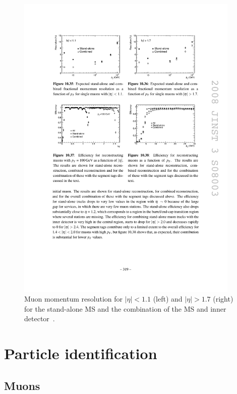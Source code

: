 \begin{figure}[tp]
  \centering
  \includegraphics[width=0.95\textwidth]{figures/performance/muon-resolution-IDvsCB}
  \caption{Muon momentum resolution for $|\eta| < 1.1$ (left) and $|\eta| > 1.7$ (right) for the stand-alone MS and the combination of the MS and inner detector~\cite{cern-jinst-atlas}.}
  \label{fig:atlas-detector-muons-resolution}
\end{figure}


\section{Particle identification}
\label{sec:particles}

\subsection{Muons}

